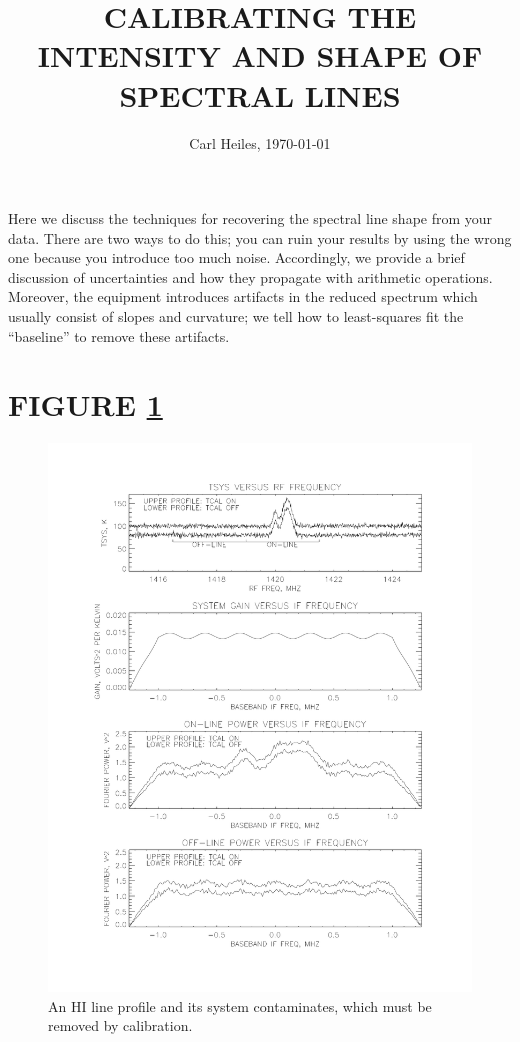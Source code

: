 \documentclass[preprint]{aastex}
\begin{document}
\title {CALIBRATING THE INTENSITY AND SHAPE OF SPECTRAL LINES}

\author{Carl Heiles, \today}

\tableofcontents

	Here we discuss the techniques for recovering the spectral line
shape from your data. There are two ways to do this; you can ruin your
results by using the wrong one because you introduce too much noise.
Accordingly, we provide a brief discussion of uncertainties and how they
propagate with arithmetic operations. Moreover, the equipment 
introduces artifacts in the reduced spectrum which usually consist of
slopes and curvature; we tell how to least-squares fit the ``baseline''
to remove these artifacts.

\section{FIGURE \ref{bumpmountain_cal}}

\begin{figure}[p!]
\centering
\includegraphics[width=5in]{bumpmountain_cal.pdf}

\caption{ An HI line profile and its system contaminates, which must be
removed by calibration. \label{bumpmountain_cal}}

\end{figure}
\end{document}
